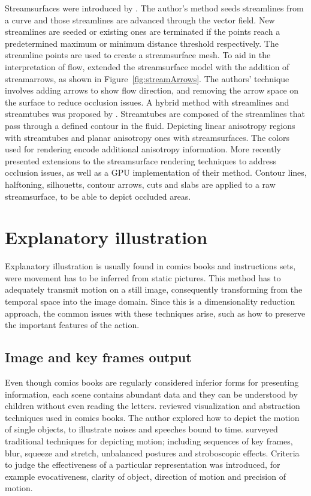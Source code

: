 Streamsurfaces were introduced by \cite{Hultquist1992}.
The author's method seeds streamlines from a curve and those streamlines are advanced through the vector field.
New streamlines are seeded or existing ones are terminated if the points reach a predetermined maximum or minimum distance threshold respectively.
The streamline points are used to create a streamsurface mesh.
To aid in the interpretation of flow, \cite{Loffelmann1997} extended the streamsurface model with the addition of streamarrows, as shown in Figure~\ref{fig:streamArrows}.
The authors' technique involves adding arrows to show flow direction, and removing the arrow space on the surface to reduce occlusion issues.
A hybrid method with streamlines and streamtubes was proposed by \cite{Zhang2003}.
Streamtubes are composed of the streamlines that pass through a defined contour in the fluid.
Depicting linear anisotropy regions with streamtubes and planar anisotropy ones with streamsurfaces.
The colors used for rendering encode additional anisotropy information.
More recently \cite{Born2010} presented extensions to the streamsurface rendering techniques to address occlusion issues, as well as a GPU implementation of their method.
Contour lines, halftoning, silhouetts, contour arrows, cuts and slabs are applied to a raw streamsurface, to be able to depict occluded areas.


\section{Explanatory illustration}

Explanatory illustration is usually found in comics books and instructions sets, were movement has to be inferred from static pictures.
This method has to adequately transmit motion on a still image, consequently transforming from the temporal space into the image domain.
Since this is a dimensionality reduction approach, the common issues with these techniques arise, such as how to preserve the important features of the action.

\subsection{Image and key frames output}

Even though comics books are regularly considered inferior forms for presenting information, each scene contains abundant data and they can be understood by children without even reading the letters.
\cite{McCloud1993} reviewed visualization and abstraction techniques used in comics books.
The author explored how to depict the motion of single objects, to illustrate noises and speeches bound to time.
\cite{Cutting2002} surveyed traditional techniques for depicting motion; including sequences of key frames, blur, squeeze and stretch, unbalanced postures and stroboscopic effects.
Criteria to judge the effectiveness of a particular representation was introduced, for example evocativeness, clarity of object, direction of motion and precision of motion.

